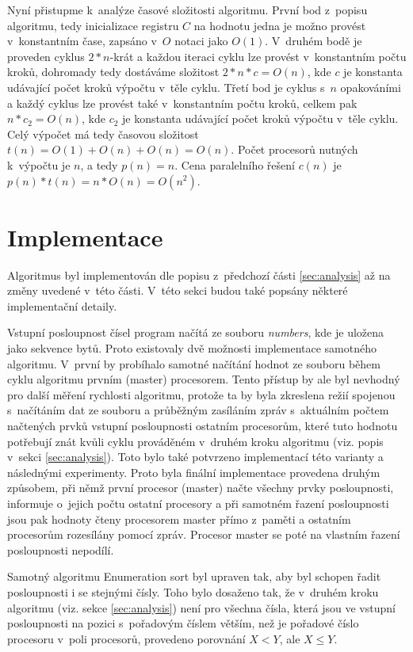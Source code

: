 \documentclass[a4paper, 12pt]{article}
\begin{document}
Nyní přistupme k~analýze časové složitosti algoritmu.
První bod z~popisu algoritmu, tedy inicializace registru $C$ na hodnotu jedna je možno provést v~konstantním čase,
zapsáno v~$O$ notaci jako $O(1)$.
V~druhém bodě je proveden cyklus $2*n$-krát a každou iteraci cyklu lze provést v~konstantním počtu kroků, dohromady tedy
dostáváme složitost $2*n*c=O(n)$, kde $c$ je konstanta udávající počet kroků výpočtu v~těle cyklu.
Třetí bod je cyklus s~$n$ opakováními a každý cyklus lze provést také v~konstantním počtu kroků, celkem pak $n*c_2=O(n)$,
kde $c_2$ je konstanta udávající počet kroků výpočtu v~těle cyklu.
Celý výpočet má tedy časovou složitost $t(n)=O(1)+O(n)+O(n)=O(n)$.
Počet procesorů nutných k~výpočtu je $n$, a tedy $p(n)=n$.
Cena paralelního řešení $c(n)$ je $p(n)*t(n)=n*O(n)=O(n^2)$.


\section{Implementace}
\label{sec:impl}
Algoritmus byl implementován dle popisu z~předchozí části \ref{sec:analysis} až na změny uvedené v~této části.
V~této sekci budou také popsány některé implementační detaily.

Vstupní posloupnost čísel program načítá ze souboru \emph{numbers}, kde je uložena jako sekvence bytů.
Proto existovaly dvě možnosti implementace samotného algoritmu.
V~první by probíhalo samotné načítání hodnot ze souboru během cyklu algoritmu prvním (master) procesorem.
Tento přístup by ale byl nevhodný pro další měření rychlosti algoritmu, protože ta by byla
zkreslena režií spojenou s~načítáním dat ze souboru a průběžným zasíláním zpráv s~aktuálním počtem načtených prvků
vstupní posloupnosti ostatním procesorům, které tuto hodnotu potřebují znát kvůli cyklu prováděném v~druhém kroku algoritmu
(viz. popis v~sekci \ref{sec:analysis}).
Toto bylo také potvrzeno implementací této varianty a následnými experimenty.
Proto byla finální implementace provedena druhým způsobem, při němž první procesor (master) načte všechny prvky posloupnosti,
informuje o~jejich počtu ostatní procesory a při samotném řazení posloupnosti jsou pak hodnoty čteny procesorem master přímo z~paměti
a ostatním procesorům rozesílány pomocí zpráv.
Procesor master se poté na vlastním řazení posloupnosti nepodílí.

Samotný algoritmu Enumeration sort byl upraven tak, aby byl schopen řadit posloupnosti i se stejnými čísly.
Toho bylo dosaženo tak, že v~druhém kroku algoritmu (viz. sekce \ref{sec:analysis}) není
pro všechna čísla, která jsou ve vstupní posloupnosti na pozici s~pořadovým
číslem větším, než je pořadové číslo procesoru v~poli procesorů,
provedeno porovnání $X<Y$, ale $X \leq Y$.
\end{document}

